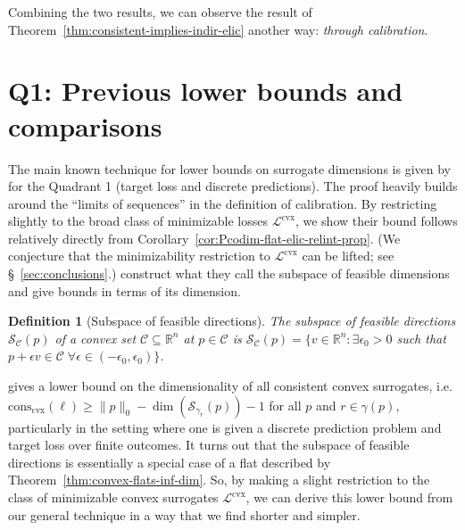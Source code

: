 \documentclass[11pt]{article} %
\newcommand{\Comments}{1}
\newcommand{\mynote}[2]{\ifnum\Comments=1\textcolor{#1}{#2}\fi}
\newcommand{\mytodo}[2]{\ifnum\Comments=1%
	\todo[linecolor=#1!80!black,backgroundcolor=#1,bordercolor=#1!80!black]{#2}\fi}
\newcommand{\jessiet}[1]{\mytodo{purple!20!white}{JF: #1}}
\newcommand{\bo}[1]{\mynote{blue}{[Bo: #1]}}
\newcommand{\reals}{\mathbb{R}}
\newcommand{\conscvx}{\mathrm{cons}_\mathrm{cvx}}
\newcommand{\C}{\mathcal{C}}
\newcommand{\Lcvx}{\mathcal{L}^{\mathrm{cvx}}}
\newcommand{\Sc}{\mathcal{S}}  %
\newtheorem{definition}{Definition}
\begin{document}
Combining the two results, we can observe the result of Theorem~\ref{thm:consistent-implies-indir-elic} another way: \emph{through calibration}.

\section{Q1: Previous lower bounds and comparisons}\label{sec:finite-calib}

The main known technique for lower bounds on surrogate dimensions is given by \citet{ramaswamy2016convex} for the Quadrant 1 (target loss and discrete predictions).
The proof heavily builds around the ``limits of sequences'' in the definition of calibration.
By restricting slightly to the broad class of minimizable losses $\Lcvx$, we show their bound follows relatively directly from Corollary~\ref{cor:Pcodim-flat-elic-relint-prop}.
(We conjecture that the minimizability restriction to $\Lcvx$ can be lifted; see \S~\ref{sec:conclusions}.)
\citet{ramaswamy2016convex} construct what they call the subspace of feasible dimensions and give bounds in terms of its dimension.
\begin{definition}[Subspace of feasible directions]\label{def:subspace-feas}
	The \emph{subspace of feasible directions} $\Sc_\C(p)$ of a convex set $\C \subseteq \reals^n$ at $p \in \C$ is $\Sc_\C(p) = \{ v \in \reals^n : \exists \epsilon_0 > 0 $ such that $p + \epsilon v \in \C \; \forall \epsilon \in (-\epsilon_0,\epsilon_0) \}$.
\end{definition}

\citet{ramaswamy2016convex} gives a lower bound on the dimensionality of all consistent convex surrogates, i.e. $\conscvx(\ell) \geq \|p\|_0 - \dim(\Sc_{\gamma_r}(p)) - 1$ for all $p$ and $r \in \gamma(p)$, particularly in the setting where one is given a discrete prediction problem and target loss over finite outcomes.
It turns out that the subspace of feasible directions is essentially a special case of a flat described by Theorem~\ref{thm:convex-flats-inf-dim}.
So, by making a slight restriction to the class of minimizable convex surrogates $\Lcvx$, we can derive this lower bound from our general technique in a way that we find shorter and simpler.
\end{document}
